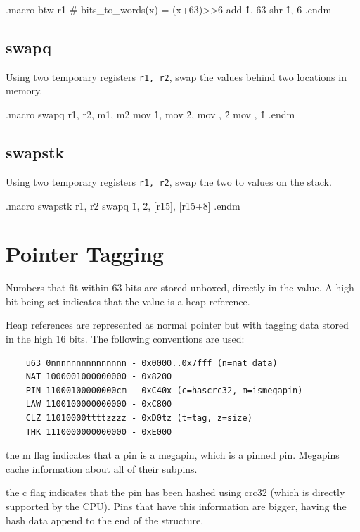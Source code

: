 \begin{asm}
.macro btw r1                               # bits_to_words(x) = (x+63)>>6
	add	\r1, 63
	shr	\r1, 6
.endm
\end{asm}

\subsection{swapq}

Using two temporary registers \lstinline|r1, r2|, swap the values behind
two locations in memory.

\begin{asm}
.macro swapq r1, r2, m1, m2
	mov	\r1, 
	mov	\r2, 
	mov	, \r2
	mov	, \r1
.endm
\end{asm}

\subsection{swapstk}

Using two temporary registers \lstinline|r1, r2|, swap the two to values
on the stack.

\begin{asm}
.macro swapstk r1, r2
	swapq	\r1, \r2, [r15], [r15+8]
.endm
\end{asm}

\section{Pointer Tagging}

Numbers that fit within 63-bits are stored unboxed, directly in the value.
A high bit being set indicates that the value is a heap reference.

Heap references are represented as normal pointer but with tagging data
stored in the high 16 bits.  The following conventions are used:

\begin{verbatim}
    u63 0nnnnnnnnnnnnnnn - 0x0000..0x7fff (n=nat data)
    NAT 1000001000000000 - 0x8200
    PIN 11000100000000cm - 0xC40x (c=hascrc32, m=ismegapin)
    LAW 1100100000000000 - 0xC800
    CLZ 11010000ttttzzzz - 0xD0tz (t=tag, z=size)
    THK 1110000000000000 - 0xE000
\end{verbatim}

the m flag indicates that a pin is a megapin, which is a pinned pin.
Megapins cache information about all of their subpins.

the c flag indicates that the pin has been hashed using crc32 (which is
directly supported by the CPU).  Pins that have this information are
bigger, having the hash data append to the end of the structure.

